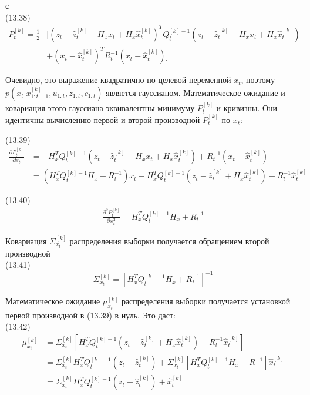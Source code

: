 \documentclass[10pt,a4paper]{article}
\begin{document}
с\\

(13.38)
\begin{equation*}
\begin{split}
P_t^{[k]}=\frac{1}{2}&[(z_t-\hat{z}_t^{[k]}-H_xx_t+H_x\hat{x}_t^{[k]})^TQ_t^{[k]-1}(z_t-\hat{z}_t^{[k]}-H_xx_t+H_x\hat{x}_t^{[k]})\\
&+(x_t-\hat{x}_t^{[k]})^TR_t^{-1}(x_t-\hat{x}_t^{[k]})]
\end{split}
\end{equation*}

Очевидно, это выражение квадратично по целевой переменной $x_t$, поэтому $p(x_t|x_{1:t-1}^{[k]},u_{1:t},z_{1:t},c_{1:t})$ является гауссианом.  Математическое ожидание и ковариация этого гауссиана
эквивалентны минимуму $P_t^{[k]}$ и кривизны. Они идентичны
вычислению первой и второй производной $P_t^{[k]}$ по $x_t$:

(13.39)
\begin{equation*}
\begin{split}
\frac{\partial P_t^{[k]}}{\partial x_t}&=-H_x^TQ_t^{[k]-1}(z_t-\hat{z}_t^{[k]}-H_xx_t+H_x\hat{x}_t^{[k]})+R_t^{-1}(x_t-\hat{x}_t^{[k]})\\
&=(H_x^TQ_t^{[k]-1}H_x+R_t^{-1})x_t-H_x^TQ_t^{[k]-1}(z_t-\hat{z}_t^{[k]}+H_x\hat{x}_t^{[k]})-R_t^{-1}\hat{x}_t^{[k]}
\end{split}
\end{equation*}

(13.40)
\begin{equation*}
\begin{split}
\frac{\partial^2 P_t^{[k]}}{\partial x_t^2}=H_x^TQ_t^{[k]-1}H_x+R_t^{-1}
\end{split}
\end{equation*}

Ковариация $\varSigma_{x_t}^{[k]}$ распределения выборки получается обращением второй производной\\

(13.41)
$$\varSigma_{x_t}^{[k]}=[H_x^TQ_t^{[k]-1}H_x+R_t^{-1}]^{-1}$$

Математическое ожидание $\mu_{x_t}^{[k]}$ распределения выборки получается установкой первой производной в (13.39) в нуль. Это даст:\\

(13.42)
\begin{equation*}
\begin{split}
\mu_{x_t}^{[k]}&=\varSigma_{x_t}^{[k]}[H_x^TQ_t^{[k]-1}(z_t-\hat{z}_t^{[k]}+H_x\hat{x}_t^{[k]})+R_t^{-1}\hat{x}_t^{[k]}]\\
&=\varSigma_{x_t}^{[k]}H_x^TQ_t^{[k]-1}(z_t-\hat{z}_t^{[k]})+\varSigma_{x_t}^{[k]}[H_x^TQ_t^{[k]-1}H_x+R^{-1}]\hat{x}_t^{[k]}\\
&=\varSigma_{x_t}^{[k]}H_x^TQ_t^{[k]-1}(z_t-\hat{z}_t^{[k]})+\hat{x}_t^{[k]}
\end{split}
\end{equation*}
\end{document}
